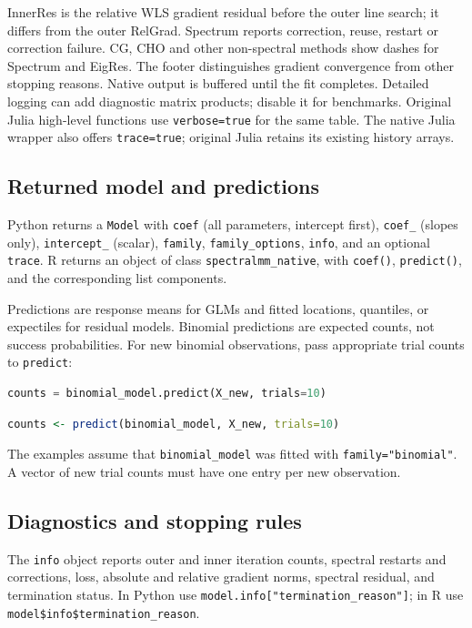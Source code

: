 \documentclass[11pt,a4paper]{article}
\newcommand{\code}[1]{\texttt{#1}}
\begin{document}
InnerRes is the relative WLS gradient residual before the outer line search;
it differs from the outer RelGrad. Spectrum reports correction, reuse, restart
or correction failure. CG, CHO and other non-spectral methods show dashes for
Spectrum and EigRes. The footer distinguishes gradient convergence from other
stopping reasons. Native output is buffered until the fit completes. Detailed
logging can add diagnostic matrix products; disable it for benchmarks.
Original Julia high-level functions use \code{verbose=true} for the same table.
The native Julia wrapper also offers \code{trace=true}; original Julia retains
its existing history arrays.

\subsection{Returned model and predictions}
Python returns a \code{Model} with \code{coef} (all parameters, intercept first),
\code{coef\_} (slopes only), \code{intercept\_} (scalar), \code{family},
\code{family\_options}, \code{info}, and an optional \code{trace}.
R returns an object of class \code{spectralmm\_native}, with \code{coef()},
\code{predict()}, and the corresponding list components.

Predictions are response means for GLMs and fitted locations, quantiles, or
expectiles for residual models. Binomial predictions are expected counts, not
success probabilities. For new binomial observations, pass appropriate trial
counts to \code{predict}:
\begin{lstlisting}[language=Python]
counts = binomial_model.predict(X_new, trials=10)
\end{lstlisting}
\begin{lstlisting}[language=R]
counts <- predict(binomial_model, X_new, trials=10)
\end{lstlisting}
The examples assume that \code{binomial\_model} was fitted with
\code{family="binomial"}. A vector of new trial counts must have one entry per
new observation.

\subsection{Diagnostics and stopping rules}
The \code{info} object reports outer and inner iteration counts, spectral restarts
and corrections, loss, absolute and relative gradient norms, spectral residual,
and termination status. In Python use \code{model.info["termination\_reason"]};
in R use \code{model\$info\$termination\_reason}.
\end{document}
